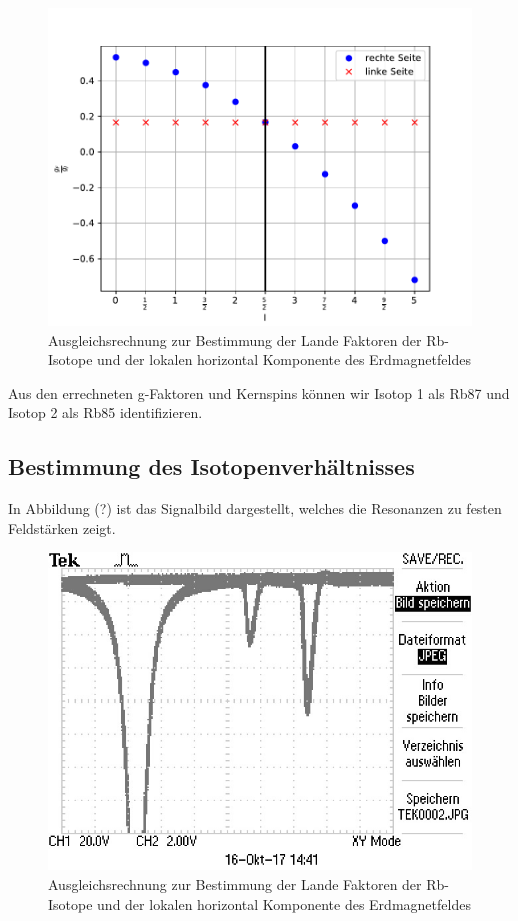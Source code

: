 \begin{figure}[H]
\centering
\includegraphics[scale=0.8]{./optischesPumpen/img/coreSpin2.pdf}
\caption{Ausgleichsrechnung zur Bestimmung der Lande Faktoren der Rb-Isotope und der lokalen horizontal Komponente des Erdmagnetfeldes}
\label{aufbau}
\end{figure}

Aus den errechneten g-Faktoren und Kernspins können wir Isotop 1 als Rb87 und Isotop 2 als Rb85 identifizieren.


\subsection{Bestimmung des Isotopenverhältnisses}
In Abbildung (?) ist das Signalbild dargestellt, welches die Resonanzen zu festen
Feldstärken zeigt.

\begin{figure}[H]
\centering
\includegraphics[scale=0.8]{./optischesPumpen/img/TEK0002.JPG}
\caption{Ausgleichsrechnung zur Bestimmung der Lande Faktoren der Rb-Isotope und der lokalen horizontal Komponente des Erdmagnetfeldes}
\label{aufbau}
\end{figure}


